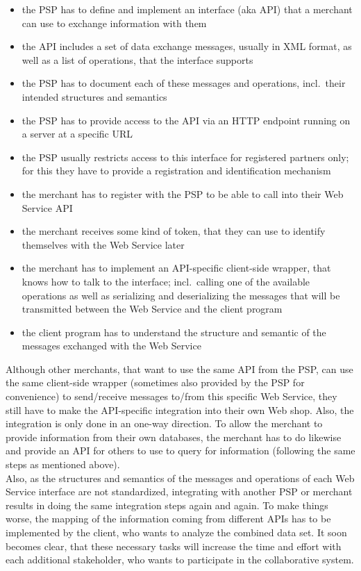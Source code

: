 \begin{itemize}
  \item the \gls{PSP} has to define and implement an interface (aka \gls{API}) that a merchant can use to exchange information with them
  \item the \gls{API} includes a set of data exchange messages, usually in \gls{XML} format, as well as a list of operations, that the interface supports
  \item the \gls{PSP} has to document each of these messages and operations, incl.\ their intended structures and semantics
  \item the \gls{PSP} has to provide access to the \gls{API} via an \gls{HTTP} endpoint running on a server at a specific \gls{URL}
  \item the \gls{PSP} usually restricts access to this interface for registered partners only; for this they have to provide a registration and identification mechanism
  \item the merchant has to register with the \gls{PSP} to be able to call into their Web Service \gls{API}
  \item the merchant receives some kind of token, that they can use to identify themselves with the Web Service later
  \item the merchant has to implement an \gls{API}-specific client-side wrapper, that knows how to talk to the interface; incl.\ calling one of the available operations as well as serializing and deserializing the messages that will be transmitted between the Web Service and the client program
  \item the client program has to understand the structure and semantic of the messages exchanged with the Web Service
\end{itemize}

Although other merchants, that want to use the same \gls{API} from the \gls{PSP}, can use the same client-side wrapper (sometimes also provided by the \gls{PSP} for convenience) to send/receive messages to/from this specific Web Service, they still have to make the \gls{API}-specific integration into their own Web shop. Also, the integration is only done in an one-way direction. To allow the merchant to provide information from their own databases, the merchant has to do likewise and provide an \gls{API} for others to use to query for information (following the same steps as mentioned above). \\

Also, as the structures and semantics of the messages and operations of each Web Service interface are not standardized, integrating with another \gls{PSP} or merchant results in doing the same integration steps again and again. To make things worse, the mapping of the information coming from different \gls{API}s has to be implemented by the client, who wants to analyze the combined data set.   It soon becomes clear, that these necessary tasks will increase the time and effort with each additional stakeholder, who wants to participate in the collaborative system. \\

